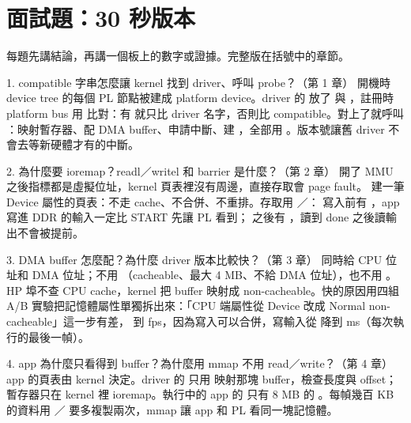 \section{面試題：30 秒版本}

每題先講結論，再講一個板上的數字或證據。完整版在括號中的章節。

\begin{qashort}{1. compatible 字串怎麼讓 kernel 找到 driver、呼叫 probe？（第 1 章）}
開機時 device tree 的每個 PL 節點被建成 platform device。driver 的  放了  與 ，註冊時 platform bus 用  比對：有  就只比 driver 名字，否則比 compatible。對上了就呼叫 ：映射暫存器、配 DMA buffer、申請中斷、建 ，全部用 。版本號讓舊 driver 不會去等新硬體才有的中斷。
\end{qashort}

\begin{qashort}{2. 為什麼要 ioremap？readl／writel 和 barrier 是什麼？（第 2 章）}
開了 MMU 之後指標都是虛擬位址，kernel 頁表裡沒有周邊，直接存取會 page fault。 建一筆 Device 屬性的頁表：不走 cache、不合併、不重排。存取用 ／： 寫入前有 ，app 寫進 DDR 的輸入一定比 START 先讓 PL 看到； 之後有 ，讀到 done 之後讀輸出不會被提前。
\end{qashort}

\begin{qashort}{3. DMA buffer 怎麼配？為什麼 driver 版本比較快？（第 3 章）}
 同時給 CPU 位址和 DMA 位址；不用 （cacheable、最大 4 MB、不給 DMA 位址），也不用 。HP 埠不查 CPU cache，kernel 把 buffer 映射成 non-cacheable。快的原因用四組 A/B 實驗把記憶體屬性單獨拆出來：「CPU 端屬性從 Device 改成 Normal non-cacheable」這一步有差，\abDrvDev{} 到 \abDrvNc{} fps，因為寫入可以合併，寫輸入從 \splitDevIn{} 降到 \splitNcIn{} ms（每次執行的最後一幀）。
\end{qashort}

\begin{qashort}{4. app 為什麼只看得到 buffer？為什麼用 mmap 不用 read／write？（第 4 章）}
app 的頁表由 kernel 決定。driver 的  只用  映射那塊 buffer，檢查長度與 offset；暫存器只在 kernel 裡 ioremap。執行中的 app 的  只有 8 MB 的 。每幀幾百 KB 的資料用 ／ 要多複製兩次，mmap 讓 app 和 PL 看同一塊記憶體。
\end{qashort}

